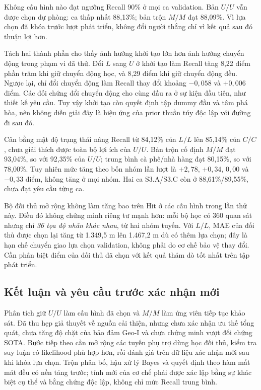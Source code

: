 Không cấu hình nào đạt ngưỡng Recall 90\% ở mọi ca validation. Bản $U/U$ vẫn được chọn dự phòng: ca thấp nhất 88,13\%; bản trộn $M/M$ đạt 88,09\%. Vì lựa chọn đã khóa trước lượt phát triển, không đổi người thắng chỉ vì kết quả sau đó thuận lợi hơn.



Tách hai thành phần cho thấy ảnh hưởng khởi tạo lớn hơn ảnh hưởng chuyển động trong phạm vi đã thử. Đổi $L$ sang $U$ ở khởi tạo làm Recall tăng 8,22 điểm phần trăm khi giữ chuyển động học, và 8,29 điểm khi giữ chuyển động đều. Ngược lại, chỉ đổi chuyển động làm Recall thay đổi khoảng $-0{,}058$ và $+0{,}006$ điểm. Các đối chứng đổi chuyển động cho cùng đầu ra ở sự kiện đầu tiên, như thiết kế yêu cầu. Tuy vậy khởi tạo còn quyết định tập dummy đầu và tâm phá hòa, nên không diễn giải đây là hiệu ứng của prior thuần túy độc lập với đường đi sau đó.

Cân bằng mật độ trạng thái nâng Recall từ 84,12\% của $L/L$ lên 85,14\% của $C/C$, chưa giải thích được toàn bộ lợi ích của $U/U$. Bản trộn cố định $M/M$ đạt 93,04\%, so với 92,35\% của $U/U$; trung bình cà phê/nhà hàng đạt 80,15\%, so với 78,00\%. Tuy nhiên mức tăng theo bốn nhóm lần lượt là $+2{,}78$, $+0{,}34$, $0{,}00$ và $-0{,}33$ điểm, không tăng ở mọi nhóm. Hai ca S3.A/S3.C còn ở 88,61\%/89,55\%, chưa đạt yêu cầu từng ca.

Bộ đối thủ mở rộng không làm tăng bao trên Hit ở các cấu hình trong lần thử này. Điều đó không chứng minh riêng tư mạnh hơn: mỗi bộ học có 360 quan sát nhưng chỉ \emph{36 tọa độ nhãn khác nhau}, từ hai nhóm tuyến. Với $L/L$, MAE của đối thủ được chọn lại tăng từ 1.349,5 m lên 1.467,2 m dù có thêm lựa chọn; đây là hạn chế chuyển giao lựa chọn validation, không phải do cơ chế bảo vệ thay đổi. Cần phân biệt điểm của đối thủ đã chọn với kết quả thăm dò tốt nhất trên tập phát triển.

\subsection{Kết luận và yêu cầu trước xác nhận mới}

Phân tích giữ $U/U$ làm cấu hình đã chọn và $M/M$ làm ứng viên tiếp tục khảo sát. Đã thu hẹp giả thuyết về nguồn cải thiện, nhưng chưa xác nhận ưu thế tổng quát, chưa tăng độ chặt của bảo đảm Geo-I và chưa chứng minh vượt đối chứng SOTA. Bước tiếp theo cần mở rộng các tuyến phụ trợ dùng học đối thủ, kiểm tra suy luận có likelihood phù hợp hơn, rồi đánh giá trên dữ liệu xác nhận mới sau khi khóa lựa chọn. Trộn phân bố, hậu xử lý Bayes và quyết định theo hàm mất mát đều có nền tảng trước; tính mới của cơ chế phải được xác lập bằng sự khác biệt cụ thể và bằng chứng độc lập, không chỉ mức Recall trung bình.
\par\endgroup
